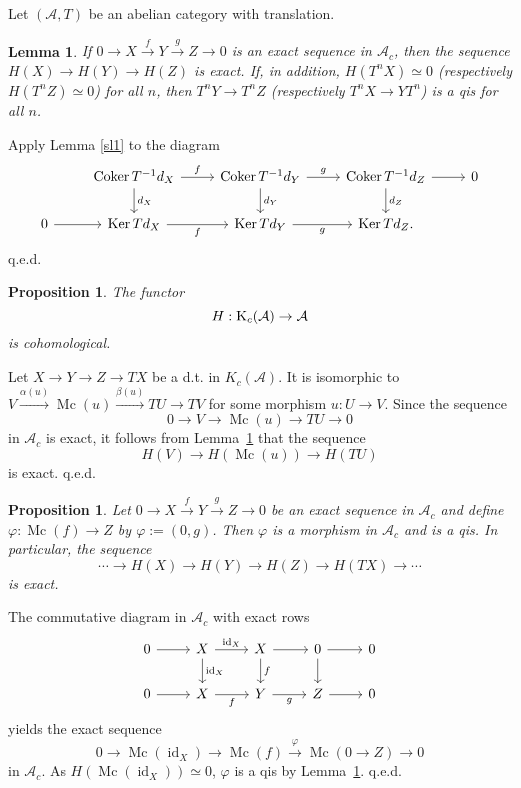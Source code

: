 \documentclass[12pt]{article}
\newtheorem{lem}[thm]{Lemma}
\newtheorem{prop}[thm]{Proposition}
\theoremstyle{remark}
\theoremstyle{definition}
\newcommand{\n}{\noindent}
\newcommand{\A}{\mathcal A}
\newcommand{\p}{\varphi}
\newcommand{\xr}{\xrightarrow}
\DeclareMathOperator{\Coker}{Coker}
\DeclareMathOperator{\id}{id}
\DeclareMathOperator{\Ker}{Ker}
\DeclareMathOperator{\Mc}{Mc}
\begin{document}
Let $(\A,T)$ be an abelian category with translation. 
%
\begin{lem}\label{sl2}
If $0\to X\xr fY\xr g Z\to0$ is an exact sequence in $\A_c$, then the sequence $H(X)\to H(Y)\to H(Z)$ is exact. If, in addition, $H(T^nX)\simeq0$ (respectively  $H(T^nZ)\simeq0$) for all $n$, then $T^nY\to T^nZ$ (respectively  $T^nX\to YT^n$) is a qis for all $n$. 
\end{lem}
% 
\n{\em Proof.} Apply Lemma \ref{sl1} to the diagram 
$$
\begin{tikzcd}
{}&\Coker T^{-1}d_X\ar{d}{d_X}\ar{r}{f}&\Coker T^{-1}d_Y\ar{d}{d_Y}\ar{r}{g}&\Coker T^{-1}d_Z\ar{d}{d_Z}\ar{r}&0\\ 
0\ar{r}&\Ker Td_X\ar{r}[swap]{f}&\Ker Td_Y\ar{r}[swap]{g}&\Ker Td_Z.
\end{tikzcd}
$$ 
q.e.d. 
%
\begin{prop}\label{sl3}
The functor 
$$
H:\text K_c(\A)\to\A
$$ 
is cohomological. 
\end{prop}
%
\n{\em Proof.} Let $X\to Y\to Z\to TX$ be a d.t. in $K_c(\A)$. It is isomorphic to $V\xr{\alpha(u)}\Mc(u)\xr{\beta(u)}TU\to TV$ for some morphism $u:U\to V$. Since the sequence  
$$
0\to V\to\Mc(u)\to TU\to0
$$ 
in $\A_c$ is exact, it follows from Lemma~\ref{sl2} that the sequence 
$$ 
H(V)\to H(\Mc(u))\to H(TU)
$$ 
is exact. q.e.d.
%
\begin{prop}\label{sl4}
Let $0\to X\xr f Y\xr g Z\to0$ be an exact sequence in $\A_c$ and define $\p:\Mc(f)\to Z$ by $\p:=(0,g)$. Then $\p$ is a morphism in $\A_c$ and is a qis. In particular, the sequence 
$$
\cdots\to H(X)\to H(Y)\to H(Z)\to H(TX)\to\cdots
$$
is exact.
\end{prop}
%
\n{\em Proof.} The commutative diagram in $\A_c$ with exact rows 
$$
\begin{tikzcd}
0\ar{r}&X\ar{d}{\id_X}\ar{r}{\id_X}&X\ar{d}{f}\ar{r}&0\ar{d}\ar{r}&0\\ 
0\ar{r}&X\ar{r}[swap]{f}&Y\ar{r}[swap]{g}&Z\ar{r}&0
\end{tikzcd}
$$ 
yields the exact sequence 
$$
0\to\Mc(\id_X)\to\Mc(f)\xr\p\Mc(0\to Z)\to0
$$
in $\A_c$. As $H(\Mc(\id_X))\simeq0$, $\p$ is a qis by Lemma~\ref{sl2}. q.e.d.
\ec 
%
\end{document}
